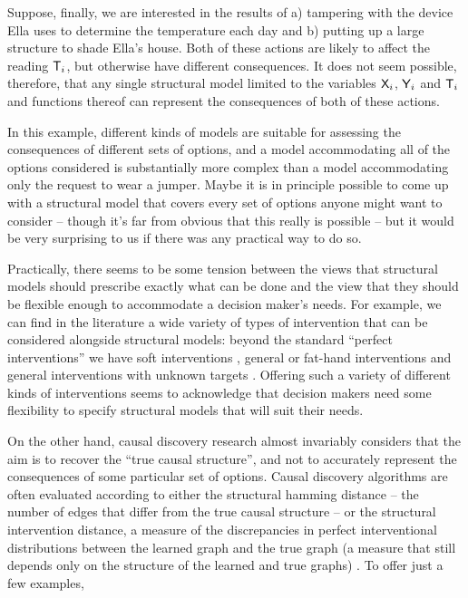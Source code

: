 \begin{example}
Suppose, finally, we are interested in the results of a) tampering with the device Ella uses to determine the temperature each day and b) putting up a large structure to shade Ella's house. Both of these actions are likely to affect the reading $\mathsf{T}_i$, but otherwise have different consequences. It does not seem possible, therefore, that any single structural model limited to the variables $\mathsf{X}_i$, $\mathsf{Y}_i$ and $\mathsf{T}_i$ and functions thereof can represent the consequences of both of these actions.
\end{example}

In this example, different kinds of models are suitable for assessing the consequences of different sets of options, and a model accommodating all of the options considered is substantially more complex than a model accommodating only the request to wear a jumper. Maybe it is in principle possible to come up with a structural model that covers every set of options anyone might want to consider -- though it's far from obvious that this really is possible -- but it would be very surprising to us if there was any practical way to do so.

Practically, there seems to be some tension between the views that structural models should prescribe exactly what can be done and the view that they should be flexible enough to accommodate a decision maker's needs. For example, we can find in the literature a wide variety of types of intervention that can be considered alongside structural models: beyond the standard ``perfect interventions'' \citep[ch. ~1]{pearl_causality:_2009,hauser_characterization_2012} we have soft interventions \citep{correa_calculus_2020,eberhardt_interventions_2007}, general or fat-hand interventions \citep{eberhardt_interventions_2007,yang_characterizing_2018,glymour_evaluating_2017} and general interventions with unknown targets \citep{brouillard_differentiable_2020}. Offering such a variety of different kinds of interventions seems to acknowledge that decision makers need some flexibility to specify structural models that will suit their needs.

On the other hand, causal discovery research almost invariably considers that the aim is to recover the ``true causal structure'', and not to accurately represent the consequences of some particular set of options. Causal discovery algorithms are often evaluated according to either the structural hamming distance -- the number of edges that differ from the true causal structure -- or the structural intervention distance, a measure of the discrepancies in perfect interventional distributions between the learned graph and the true graph (a measure that still depends only on the structure of the learned and true graphs) \citep{peters_structural_2015}. To offer just a few examples, \citep{brouillard_differentiable_2020,scherrer_learning_2022,toth_active_2022}

